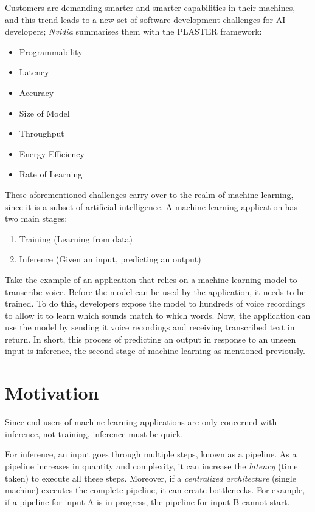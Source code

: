 \documentclass{report}
\begin{document}
Customers are demanding smarter and smarter capabilities in their machines, and this trend leads to a new set of software development challenges for AI developers; \textit{Nvidia} summarises them with the PLASTER \cite{Teich2018} framework:
\begin{itemize}
  \item Programmability
  \item Latency
  \item Accuracy
  \item Size of Model
  \item Throughput
  \item Energy Efficiency
  \item Rate of Learning
\end{itemize}

These aforementioned challenges carry over to the realm of machine learning, since it is a subset of artificial intelligence. A machine learning application has two main stages:
\begin{enumerate}
  \item Training (Learning from data)
  \item Inference (Given an input, predicting an output)
\end{enumerate}

Take the example of an application that relies on a machine learning model to transcribe voice. Before the model can be used by the application, it needs to be trained. To do this, developers expose the model to hundreds of voice recordings to allow it to learn which sounds match to which words. Now, the application can use the model by sending it voice recordings and receiving transcribed text in return. In short, this process of predicting an output in response to an unseen input is inference, the second stage of machine learning as mentioned previously.

\section{Motivation}

Since end-users of machine learning applications are only concerned with inference, not training, inference must be quick.

For inference, an input goes through multiple steps, known as a pipeline. As a pipeline increases in quantity and complexity, it can increase the \textit{latency} (time taken) to execute all these steps. Moreover, if a \textit{centralized architecture} (single machine) executes the complete pipeline, it can create bottlenecks. For example, if a pipeline for input A is in progress, the pipeline for input B cannot start.
\end{document}
